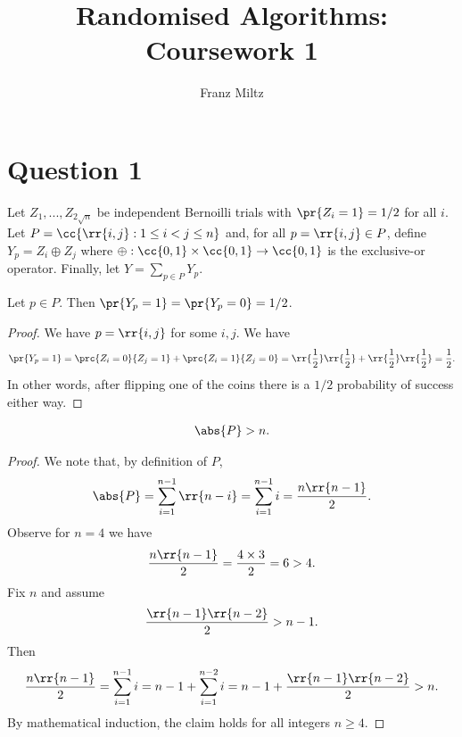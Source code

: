 \documentclass{article}
\title{Randomised Algorithms: Coursework 1}
\author{Franz Miltz}
\begin{document}
\maketitle

\section*{Question 1}

Let $Z_1,...,Z_{2\sqrt{n}}$ be independent Bernoilli trials with $\pr{Z_i=1}=1/2$
for all $i$. Let $P=\cc{\rr{i,j} : 1\leq i<j\leq n}$ and, for all $p=\rr{i,j}\in P$, define
$Y_p=Z_i\oplus Z_j$ where $\oplus:\cc{0,1}\times\cc{0,1}\to\cc{0,1}$ is the exclusive-or
operator. Finally, let $Y=\sum_{p\in P} Y_p$.

\begin{claim*}[a]
  Let $p\in P$. Then $\pr{Y_p=1}=\pr{Y_p=0}=1/2$.
  \begin{proof}
    We have $p=\rr{i,j}$ for some $i,j$. We have
    \begin{align*}
      \pr{Y_p=1}=\prc{Z_i=0}{Z_j=1}+\prc{Z_i=1}{Z_j=0}=\rr{\frac{1}{2}}\rr{\frac{1}{2}}+\rr{\frac{1}{2}}\rr{\frac{1}{2}}=\frac{1}{2}.
    \end{align*}
    In other words, after flipping one of the coins there is a $1/2$ probability of success
    either way.
  \end{proof}
\end{claim*}

\begin{claim*}[b]
  \begin{align*}
    \abs{P}>n.
  \end{align*}
  \begin{proof}
    We note that, by definition of $P$,
    \begin{align*}
      \abs{P}=\sum_{i=1}^{n-1} \rr{n-i} = \sum_{i=1}^{n-1} i = \frac{n\rr{n-1}}{2}.
    \end{align*}
    Observe for $n=4$ we have
    \begin{align*}
      \frac{n\rr{n-1}}{2}=\frac{4\times 3}{2}=6>4.
    \end{align*}
    Fix $n$ and assume
    \begin{align*}
      \frac{\rr{n-1}\rr{n-2}}{2} > n-1.
    \end{align*}
    Then
    \begin{align*}
      \frac{n\rr{n-1}}{2}
      = \sum_{i=1}^{n-1} i
      = n-1 + \sum_{i=1}^{n-2} i
      = n-1 + \frac{\rr{n-1}\rr{n-2}}{2} > n.
    \end{align*}
    By mathematical induction, the claim holds for all integers $n\geq 4$.
  \end{proof}
\end{claim*}
\end{document}
